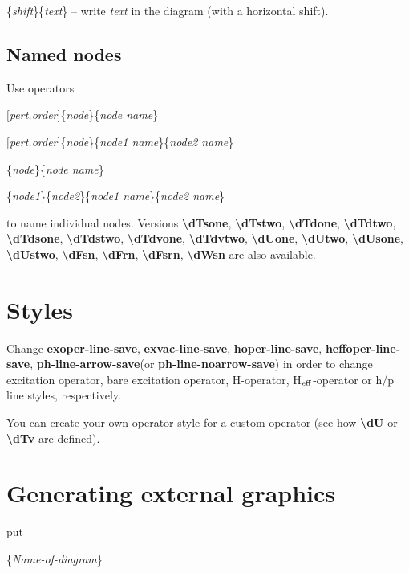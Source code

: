 \documentclass[a4paper]{article}
\newcommand{\myind}{\hspace{10pt}}
\begin{document}
\myind{\bf \textbackslash dtext}\{{\it shift}\}\{{\it text}\} -- write {\it text} in the diagram (with a horizontal shift).

\subsection{Named nodes}

Use operators

\myind{\bf \textbackslash dTone}$[${\it pert.order}$]$\{{\it node}\}\{{\it node name}\}

\myind{\bf \textbackslash dTtwo}$[${\it pert.order}$]$\{{\it node}\}\{{\it node1 name}\}\{{\it node2 name}\}

\myind{\bf \textbackslash dFn}\{{\it node}\}\{{\it node name}\}

\myind{\bf \textbackslash dWn}\{{\it node1}\}\{{\it node2}\}\{{\it node1 name}\}\{{\it node2 name}\}

to name individual nodes. Versions
{\bf \textbackslash dTsone},
{\bf \textbackslash dTstwo},
{\bf \textbackslash dTdone},
{\bf \textbackslash dTdtwo},
{\bf \textbackslash dTdsone},
{\bf \textbackslash dTdstwo},
{\bf \textbackslash dTdvone},
{\bf \textbackslash dTdvtwo},
{\bf \textbackslash dUone},
{\bf \textbackslash dUtwo},
{\bf \textbackslash dUsone},
{\bf \textbackslash dUstwo},
{\bf \textbackslash dFsn},
{\bf \textbackslash dFrn},
{\bf \textbackslash dFsrn},
{\bf \textbackslash dWsn}
are also available.

\section{Styles}\label{sec:Styles}

Change {\bf exoper-line-save}, {\bf exvac-line-save}, {\bf hoper-line-save}, {\bf heffoper-line-save}, 
{\bf ph-line-arrow-save}(or {\bf ph-line-noarrow-save}) in order to change excitation operator, 
bare excitation operator, H-operator, H$_{\rm eff}$-operator or h/p line styles, respectively.

You can create your own operator style for a custom operator (see how {\bf \textbackslash dU} or {\bf \textbackslash dTv} are 
defined).

\section{Generating external graphics}

put 

\myind{\bf \textbackslash beginpgfgraphicnamed}\{{\it Name-of-diagram}\}
\end{document}
